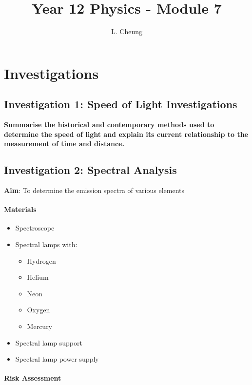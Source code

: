 \documentclass{report}
\title{\Huge Year 12 Physics - Module 7}
\author{L. Cheung}
\begin{document}
	\maketitle
	\tableofcontents
\newpage

\chapter{Investigations}

	\section{Investigation 1: Speed of Light Investigations}
	
		\textbf{Summarise the historical and contemporary methods used to determine the speed of light and explain its current relationship to the measurement of time and distance.}
		
\newpage

	\section{Investigation 2: Spectral Analysis}
	
		\textbf{Aim}: To determine the emission spectra of various elements

		\subsubsection{Materials}
		
			\begin{itemize}
				\item Spectroscope
				\item Spectral lamps with:
					\begin{itemize}
						\item Hydrogen
						\item Helium
						\item Neon
						\item Oxygen
						\item Mercury
					\end{itemize}
				\item Spectral lamp support
				\item Spectral lamp power supply
			\end{itemize}

		\subsubsection{Risk Assessment}
\end{document}
